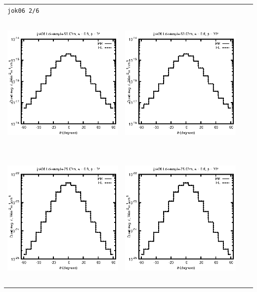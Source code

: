 \begin{tabular}{c c c c}
\multicolumn{4}{l}{\texttt{jok06 2/6}} \\
\includegraphics[height=7cm]{../eps/jok06_Ld_sample_50.00m_fwd.eps} &
\includegraphics[height=7cm]{../eps/jok06_Ld_sample_50.00m_cross.eps} \\
\includegraphics[height=7cm]{../eps/jok06_Ld_sample_75.00m_fwd.eps} &
\includegraphics[height=7cm]{../eps/jok06_Ld_sample_75.00m_cross.eps} \\

\end{tabular}
